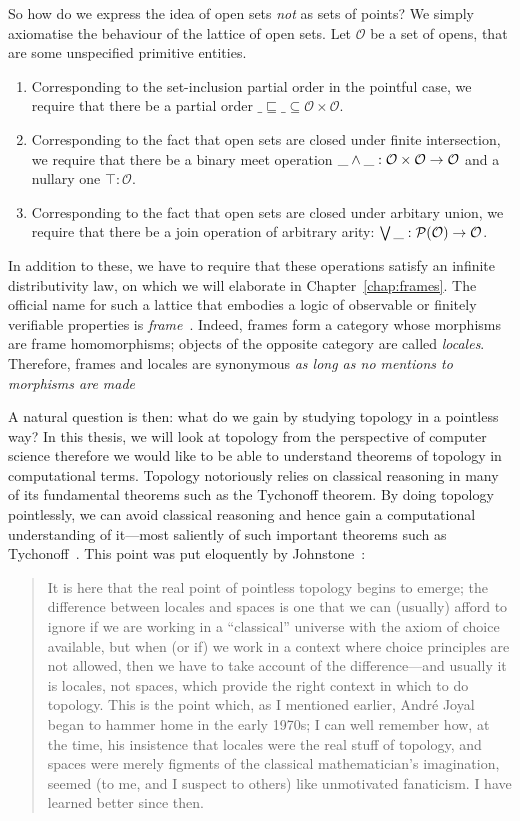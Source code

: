 So how do we express the idea of open sets \emph{not} as sets of points? We simply
axiomatise the behaviour of the lattice of open sets. Let $\mathcal{O}$ be a set of
opens, that are some unspecified primitive entities.
\begin{enumerate}
  \item Corresponding to the set-inclusion partial order in the pointful case, we require
    that there be a partial order $\_\sqsubseteq\_ \subseteq \mathcal{O} \times \mathcal{O}$.
  \item Corresponding to the fact that open sets are closed under finite intersection, we
    require that there be a binary meet operation $\_ \wedge \_ : \mathcal{O} \times
    \mathcal{O} \rightarrow \mathcal{O}$ and a nullary one $\top : \mathcal{O}$.
  \item Corresponding to the fact that open sets are closed under arbitary union, we
    require that there be a join operation of arbitrary arity: $\bigvee{}\_ :
    \mathcal{P}(\mathcal{O}) \rightarrow \mathcal{O}$.
\end{enumerate}
In addition to these, we have to require that these operations satisfy an infinite
distributivity law, on which we will elaborate in Chapter~\ref{chap:frames}. The official
name for such a lattice that embodies a logic of observable or finitely verifiable
properties is \emph{frame}~\cite{vickers}. Indeed, frames form a category whose morphisms
are frame homomorphisms; objects of the opposite category are called \emph{locales}.
Therefore, frames and locales are synonymous
\emph{as long as no mentions to morphisms are made}~\cite{vickers, stone-spaces}

A natural question is then: what do we gain by studying topology in a pointless way? In
this thesis, we will look at topology from the perspective of computer science therefore
we would like to be able to understand theorems of topology in computational terms.
Topology notoriously relies on classical reasoning in many of its fundamental theorems
such as the Tychonoff theorem. By doing topology pointlessly, we can avoid classical
reasoning and hence gain a computational understanding of it---most saliently of such
important theorems such as Tychonoff~\cite{coq-tychonoff}. This point was put eloquently
by Johnstone~\cite[pg.~46]{stone-spaces}:
\begin{quote}
  It is here that the real point of pointless topology begins to emerge; the difference
  between locales and spaces is one that we can (usually) afford to ignore if we are
  working in a ``classical'' universe with the axiom of choice available, but when (or if)
  we work in a context where choice principles are not allowed, then we have to take
  account of the difference—and usually it is locales, not spaces, which provide the right
  context in which to do topology. This is the point which, as I mentioned earlier,
  Andr\'{e} Joyal began to hammer home in the early 1970s; I can well remember how, at the
  time, his insistence that locales were the real stuff of topology, and spaces were
  merely figments of the classical mathematician's imagination, seemed (to me, and I
  suspect to others) like unmotivated fanaticism. I have learned better since then.
\end{quote}

